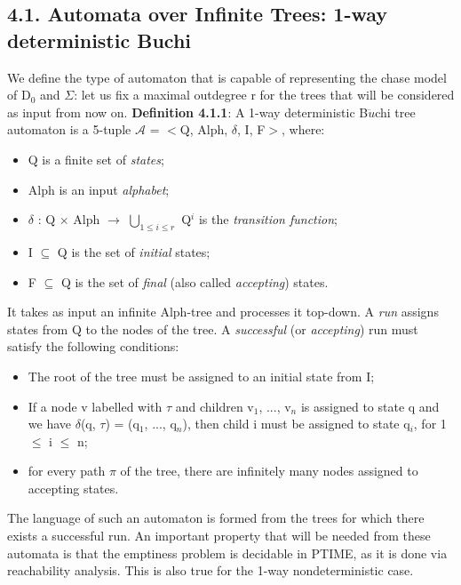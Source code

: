 \documentclass[11pt, a4paper, dvipsnames]{article}
\begin{document}
\subsection{4.1. Automata over Infinite Trees: 1-way deterministic Buchi}
We define the type of automaton that is capable of representing the chase model of D$_{0}$ and $\Sigma$: let us fix a maximal outdegree r for the trees that will be considered as input from now on.\newline
\textbf{Definition 4.1.1}: A 1-way deterministic B$\ddot{u}$chi tree automaton is a 5-tuple \newline
$\mathcal{A}$ = $<$Q, Alph, $\delta$, I, F$>$, where:
\begin{itemize}
	\item Q is a finite set of \textit{states};
	\item Alph is an input \textit{alphabet};
	\item $\delta$ : Q $\times$ Alph $\rightarrow$ $\bigcup_{1 \leq i \leq r}$ Q$^{i}$ is the \textit{transition function};
	\item I $\subseteq$ Q is the set of \textit{initial} states;
	\item F $\subseteq$ Q is the set of \textit{final} (also called \textit{accepting}) states.
\end{itemize}
It takes as input an infinite Alph-tree and processes it top-down. A \textit{run} assigns states from Q to the nodes of the tree. A \textit{successful} (or \textit{accepting}) run must satisfy the following conditions:
\begin{itemize}
	\item The root of the tree must be assigned to an initial state from I;
	\item If a node v labelled with $\tau$ and children v$_{1}$, ..., v$_{n}$ is assigned to state q and we have $\delta$(q, $\tau$) = (q$_{1}$, ..., q$_{n}$), then child i must be assigned to state q$_{i}$, for 1 $\leq$ i $\leq$ n;
	\item for every path $\pi$ of the tree, there are infinitely many nodes assigned to accepting states. 
\end{itemize}
The language of such an automaton is formed from the trees for which there exists a successful run. An important property that will be needed from these automata is that the emptiness problem is decidable in PTIME, as it is done via reachability analysis. This is also true for the 1-way nondeterministic case.
\end{document}
